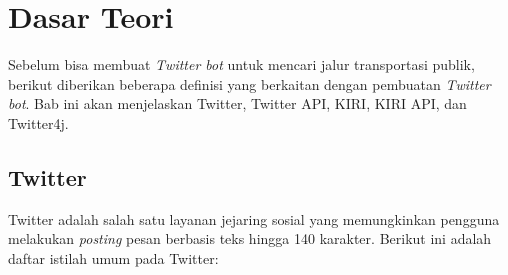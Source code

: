 \chapter{Dasar Teori}
\label{chap:dasar teori}

Sebelum bisa membuat \textit{Twitter bot} untuk mencari jalur transportasi publik, berikut diberikan beberapa definisi yang berkaitan dengan pembuatan \textit{Twitter bot}. Bab ini akan menjelaskan Twitter, Twitter API, KIRI, KIRI API, dan Twitter4j.

\section{Twitter \cite{TwitterBook}}
\label{sec:twitter}

Twitter adalah salah satu layanan jejaring sosial yang memungkinkan pengguna melakukan \textit{posting} pesan berbasis teks hingga 140 karakter. Berikut ini adalah daftar istilah umum pada Twitter:


